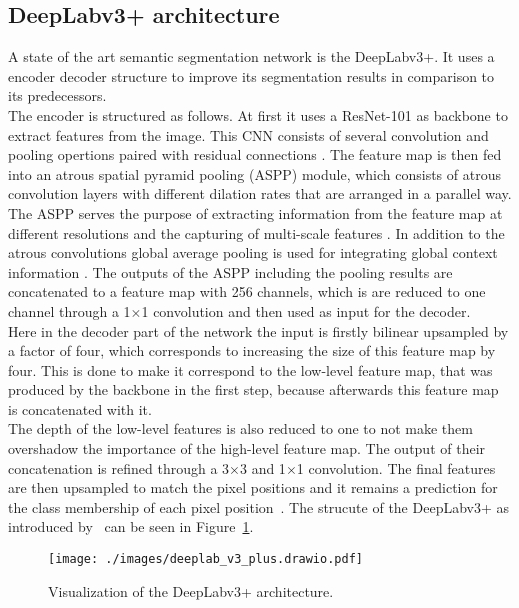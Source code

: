 \subsection{DeepLabv3+ architecture}\label{dlv3_section}
A state of the art semantic segmentation network is the DeepLabv3+.
It uses a encoder decoder structure to improve its segmentation results in comparison to its predecessors.\\
The encoder is structured as follows.
At first it uses a ResNet-101 as backbone to extract features from the image.
This CNN consists of several convolution and pooling opertions paired with residual connections \cite{Chen2018a}.
The feature map is then fed into an atrous spatial pyramid pooling (ASPP) module, which consists of atrous convolution layers with different dilation rates that are arranged in a parallel way.
The ASPP serves the purpose of extracting information from the feature map at different resolutions and the capturing of multi-scale features \cite{Chen2018}.
In addition to the atrous convolutions global average pooling is used for integrating global context information \cite{Chen2017}.
The outputs of the ASPP including the pooling results are concatenated to a feature map with 256 channels, which is are reduced to one channel through a 1$\times$1 convolution and then used as input for the decoder.\\
Here in the decoder part of the network the input is firstly bilinear upsampled by a factor of four, which corresponds to increasing the size of this feature map by four.
This is done to make it correspond to the low-level feature map, that was produced by the backbone in the first step, because afterwards this feature map is concatenated with it.\\
The depth of the low-level features is also reduced to one to not make them overshadow the importance of the high-level feature map.
The output of their concatenation is refined through a 3$\times$3 and 1$\times$1 convolution.
The final features are then upsampled to match the pixel positions and it remains a prediction for the class membership of each pixel position~\cite{Chen2018a}.
The strucute of the DeepLabv3+ as introduced by~\cite{Chen2018a} can be seen in Figure~\ref{deeplab_v3_plus}.
\begin{figure}[bt]
    \begin{center}
     \texttt{[image: ./images/deeplab\_v3\_plus.drawio.pdf]}
    \caption[DeepLabv3+ architecture.]{{Visualization of the DeepLabv3+ architecture.}\label{deeplab_v3_plus}}
    \end{center}
\end{figure}
